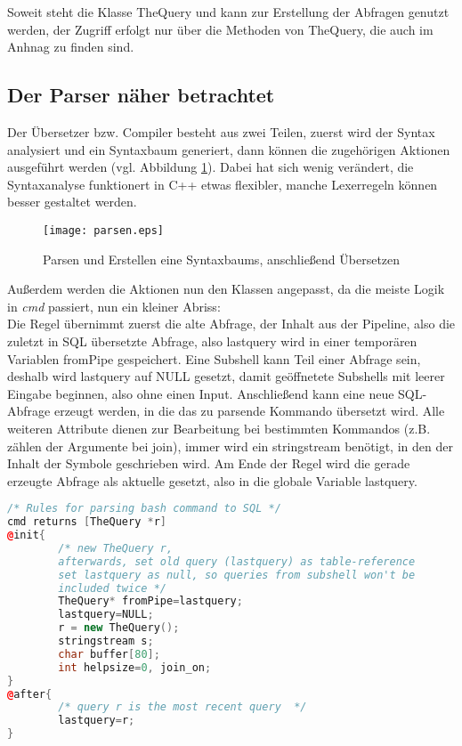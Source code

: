 Soweit steht die Klasse TheQuery und kann zur Erstellung der Abfragen genutzt werden, der Zugriff erfolgt nur über die Methoden von TheQuery, die auch im Anhnag zu finden sind.

\subsection{Der Parser näher betrachtet}
Der Übersetzer bzw. Compiler besteht aus zwei Teilen, zuerst wird der Syntax analysiert und ein Syntaxbaum generiert, dann können die zugehörigen Aktionen ausgeführt werden (vgl. Abbildung \ref{fig:parsen}). Dabei hat sich wenig verändert, die Syntaxanalyse funktionert in C++ etwas flexibler, manche Lexerregeln können besser gestaltet werden.

\begin{figure}[h]
\centering
\texttt{[image: parsen.eps]}
\caption{Parsen und Erstellen eine Syntaxbaums, anschließend Übersetzen}
\label{fig:parsen}
\end{figure}

Außerdem werden die Aktionen nun den Klassen angepasst, da die meiste Logik in \textit{cmd} passiert, nun ein kleiner Abriss:\\
Die Regel übernimmt zuerst die alte Abfrage, der Inhalt aus der Pipeline, also die zuletzt in SQL übersetzte Abfrage, also lastquery wird in einer temporären Variablen fromPipe gespeichert. Eine Subshell kann Teil einer Abfrage sein, deshalb wird lastquery auf NULL gesetzt, damit geöffnetete Subshells mit leerer Eingabe beginnen, also ohne einen Input. Anschließend kann eine neue SQL-Abfrage erzeugt werden, in die das zu parsende Kommando übersetzt wird. Alle weiteren Attribute dienen zur Bearbeitung bei bestimmten Kommandos (z.B. zählen der Argumente bei join), immer wird ein stringstream benötigt, in den der Inhalt der Symbole geschrieben wird. Am Ende der Regel wird die gerade erzeugte Abfrage als aktuelle gesetzt, also in die globale Variable lastquery.

\begin{lstlisting}[language=C++]
/* Rules for parsing bash command to SQL */
cmd returns [TheQuery *r]
@init{
        /* new TheQuery r,
        afterwards, set old query (lastquery) as table-reference
        set lastquery as null, so queries from subshell won't be
        included twice */
        TheQuery* fromPipe=lastquery;
        lastquery=NULL;
        r = new TheQuery();
        stringstream s;
        char buffer[80];
        int helpsize=0, join_on;
}
@after{
        /* query r is the most recent query  */
        lastquery=r;
}
\end{lstlisting}

